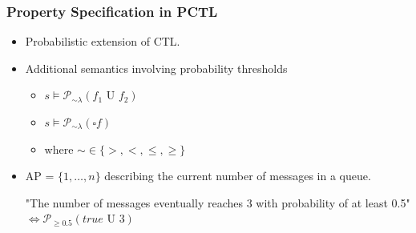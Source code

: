 \documentclass{beamer}
\theoremstyle{definition}
\begin{document}
\begin{frame}
    \frametitle{Property Specification in PCTL}

    \begin{itemize}
        \item Probabilistic extension of CTL.
        \item Additional semantics involving probability thresholds
            \begin{itemize}
                \item $ s \vDash \mathcal{P}_{\sim\lambda}(f_1 \text{ U } f_2) $
                \item $ s \vDash \mathcal{P}_{\sim\lambda}(\square f) $
                \item where $ \sim \in \{ >, <, \leq, \geq \} $
            \end{itemize}
        \item AP = $ \{ 1, \ldots, n \} $ describing the current number of
            messages in a queue.

            "The number of messages eventually reaches 3 with probability of at least 0.5"
            $ \iff \mathcal{P}_{\geq 0.5}(true \text{ U } 3) $
    \end{itemize}
\end{frame}
\end{document}
